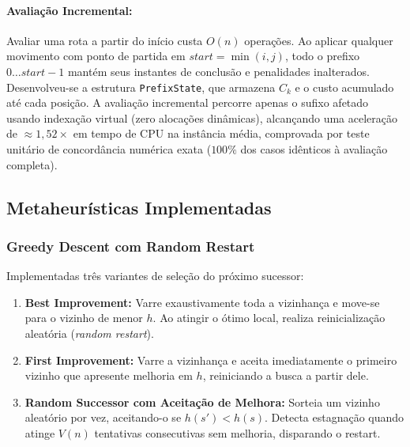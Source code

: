 \documentclass[11pt,a4paper]{article}
\begin{document}
\paragraph{Avaliação Incremental:} Avaliar uma rota a partir do início custa $O(n)$ operações. Ao aplicar qualquer movimento com ponto de partida em $start = \min(i, j)$, todo o prefixo $0 \dots start-1$ mantém seus instantes de conclusão e penalidades inalterados. Desenvolveu-se a estrutura \texttt{PrefixState}, que armazena $C_k$ e o custo acumulado até cada posição. A avaliação incremental percorre apenas o sufixo afetado usando indexação virtual (zero alocações dinâmicas), alcançando uma aceleração de $\approx 1{,}52\times$ em tempo de CPU na instância média, comprovada por teste unitário de concordância numérica exata ($100\%$ dos casos idênticos à avaliação completa).

\subsection{Metaheurísticas Implementadas}

\subsubsection{Greedy Descent com Random Restart}
Implementadas três variantes de seleção do próximo sucessor:
\begin{enumerate}
    \item \textbf{Best Improvement:} Varre exaustivamente toda a vizinhança e move-se para o vizinho de menor $h$. Ao atingir o ótimo local, realiza reinicialização aleatória (\emph{random restart}).
    \item \textbf{First Improvement:} Varre a vizinhança e aceita imediatamente o primeiro vizinho que apresente melhoria em $h$, reiniciando a busca a partir dele.
    \item \textbf{Random Successor com Aceitação de Melhora:} Sorteia um vizinho aleatório por vez, aceitando-o se $h(s') < h(s)$. Detecta estagnação quando atinge $V(n)$ tentativas consecutivas sem melhoria, disparando o restart.
\end{enumerate}
\end{document}
